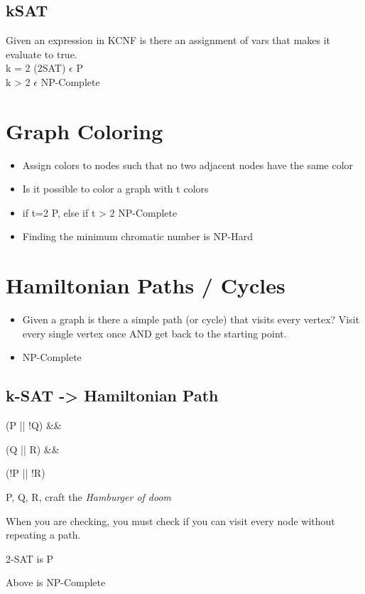 \documentclass{article}
\begin{document}
\subsection{kSAT}
\label{sec:org6ccc309}
Given an expression in KCNF is there an assignment of vars that makes it evaluate to true. \\
k = 2 (2SAT) \(\epsilon\) P \\
k > 2 \(\epsilon\) NP-Complete

\section{Graph Coloring}
\label{sec:orgcb6f468}
\begin{itemize}
\item Assign colors to nodes such that no two adjacent nodes have the same color
\item Is it possible to color a graph with t colors
\item if t=2 P, else if t > 2 NP-Complete
\item Finding the minimum chromatic number is NP-Hard
\end{itemize}

\section{Hamiltonian Paths / Cycles}
\label{sec:orgfcf6f9b}
\begin{itemize}
\item Given a graph is there a simple path (or cycle) that visits every vertex? Visit every single vertex once AND get back to the starting point.
\item NP-Complete
\end{itemize}
\subsection{k-SAT -> Hamiltonian Path}
\label{sec:orgaa6fc21}
\begin{description}
\item[{E1}] (P || !Q) \&\&
\item[{E2}] (Q || R) \&\&
\item[{E3}] (!P || !R)
\item P, Q, R, craft the \emph{Hamburger of doom}
\item When you are checking, you must check if you can visit every node without repeating a path.
\item 2-SAT is P
\item Above is NP-Complete
\end{description}
\end{document}

